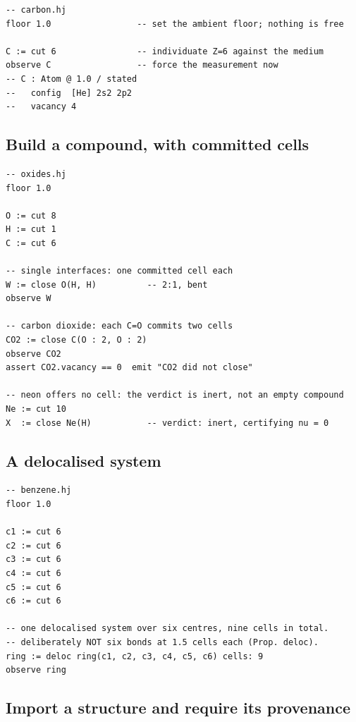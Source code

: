 \documentclass[11pt,twocolumn,a4paper]{article}
\theoremstyle{thmstyle}
\theoremstyle{definition}
\theoremstyle{remark}
\begin{document}
\begin{lstlisting}[caption={Individuating carbon (a length-one cut).}]
-- carbon.hj
floor 1.0                 -- set the ambient floor; nothing is free

C := cut 6                -- individuate Z=6 against the medium
observe C                 -- force the measurement now
-- C : Atom @ 1.0 / stated
--   config  [He] 2s2 2p2
--   vacancy 4
\end{lstlisting}

\subsection{Build a compound, with committed cells}

\begin{lstlisting}[caption={Water and carbon dioxide. The cell count is
what distinguishes a double interface from two singles.}]
-- oxides.hj
floor 1.0

O := cut 8
H := cut 1
C := cut 6

-- single interfaces: one committed cell each
W := close O(H, H)          -- 2:1, bent
observe W

-- carbon dioxide: each C=O commits two cells
CO2 := close C(O : 2, O : 2)
observe CO2
assert CO2.vacancy == 0  emit "CO2 did not close"

-- neon offers no cell: the verdict is inert, not an empty compound
Ne := cut 10
X  := close Ne(H)           -- verdict: inert, certifying nu = 0
\end{lstlisting}

\subsection{A delocalised system}

\begin{lstlisting}[caption={Benzene: a ring, not six pairwise bonds.}]
-- benzene.hj
floor 1.0

c1 := cut 6
c2 := cut 6
c3 := cut 6
c4 := cut 6
c5 := cut 6
c6 := cut 6

-- one delocalised system over six centres, nine cells in total.
-- deliberately NOT six bonds at 1.5 cells each (Prop. deloc).
ring := deloc ring(c1, c2, c3, c4, c5, c6) cells: 9
observe ring
\end{lstlisting}

\subsection{Import a structure and require its provenance}
\end{document}
